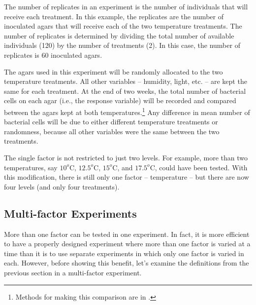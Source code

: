 \documentclass[10pt,openany]{book}\usepackage[]{graphicx}\usepackage[]{color}
\begin{document}
The number of replicates in an experiment is the number of individuals that will receive each treatment.  In this example, the replicates are the number of inoculated agars that will receive each of the two temperature treatments.  The number of replicates is determined by dividing the total number of available individuals (120) by the number of treatments (2).  In this case, the number of replicates is 60 inoculated agars.


\vspace{-12pt}

\vspace{-12pt}

\vspace{-12pt}

The agars used in this experiment will be randomly allocated to the two temperature treatments.  All other variables -- humidity, light, etc. -- are kept the same for each treatment.  At the end of two weeks, the total number of bacterial cells on each agar (i.e., the response variable) will be recorded and compared between the agars kept at both temperatures.\footnote{Methods for making this comparison are in .}  Any difference in mean number of bacterial cells will be due to either different temperature treatments or randomness, because all other variables were the same between the two treatments.


The single factor is not restricted to just two levels.  For example, more than two temperatures, say $10^{o}$C, $12.5^{o}$C, $15^{o}$C, and $17.5^{o}$C, could have been tested.  With this modification, there is still only one factor -- temperature -- but there are now four levels (and only four treatments).

\subsection{Multi-factor Experiments}
More than one factor can be tested in one experiment.  In fact, it is more efficient to have a properly designed experiment where more than one factor is varied at a time than it is to use separate experiments in which only one factor is varied in each.  However, before showing this benefit, let's examine the definitions from the previous section in a multi-factor experiment.
\end{document}
